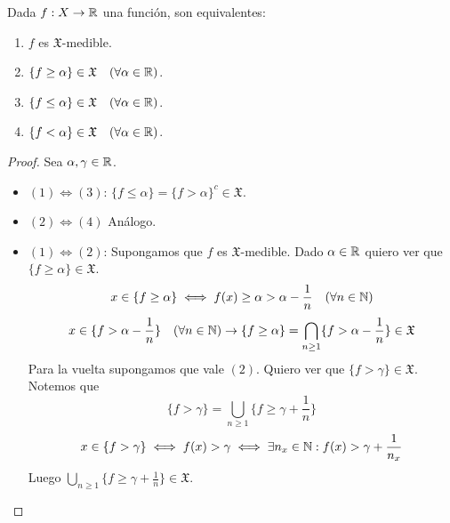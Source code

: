 \begin{lemma}
    Dada $f: X \to \mathbb{R}$ una función, son equivalentes:
    \begin{enumerate}
        \item $f$ es $\mathfrak{X}$-medible.
        \item $\{ f \geq \alpha \} \in \mathfrak{X} \quad (\forall \alpha \in \mathbb{R})$.
        \item $\{ f \leq \alpha \} \in \mathfrak{X} \quad (\forall \alpha \in \mathbb{R})$.
        \item $\{ f < \alpha \} \in \mathfrak{X} \quad (\forall \alpha \in \mathbb{R})$.
    \end{enumerate}

    \begin{proof}
        Sea $\alpha, \gamma \in \mathbb{R}$.
        \begin{itemize}
            \item $(1) \iff (3)$: $\{ f \leq \alpha \} = \{ f > \alpha \}^c \in \mathfrak{X}$.
            \item $(2) \iff (4)$ Análogo.
            \item $(1) \iff (2)$: Supongamos que $f$ es $\mathfrak{X}$-medible. Dado $\alpha \in \mathbb{R}$ quiero ver que $\{ f \geq \alpha \} \in \mathfrak{X}$.
                  \begin{equation}
                      x \in \{ f \geq \alpha \} \iff f(x) \geq \alpha > \alpha - \frac{1}{n} \quad (\forall n \in \mathbb{N})
                  \end{equation}
                  \begin{equation}
                      x \in \{ f > \alpha - \frac{1}{n} \} \quad (\forall n \in \mathbb{N}) \to \{ f \geq \alpha \} = \bigcap_{n \geq 1} \{ f > \alpha - \frac{1}{n} \} \in \mathfrak{X}
                  \end{equation}
                  Para la vuelta supongamos que vale $(2)$. Quiero ver que $\{ f > \gamma \} \in \mathfrak{X}$. Notemos que
                  \begin{equation}
                      \{ f > \gamma \} = \bigcup_{n \geq 1} \{ f \geq \gamma + \frac{1}{n} \}
                  \end{equation}
                  \begin{equation}
                      x \in \{ f > \gamma \} \iff f(x) > \gamma \iff \exists n_x \in \mathbb{N} : f(x) > \gamma + \frac{1}{n_x}
                  \end{equation}
                  Luego $\bigcup_{n \geq 1} \{ f \geq \gamma + \frac{1}{n} \} \in \mathfrak{X}$.
        \end{itemize}
    \end{proof}
\end{lemma}

